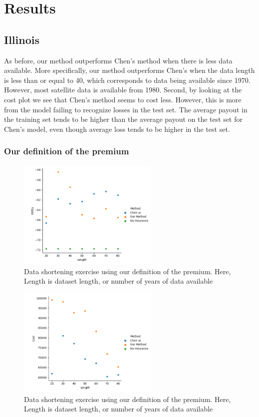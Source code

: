\documentclass[11pt]{article}
\begin{document}
\section{Results}
  \subsection{Illinois}
    As before, our method outperforms Chen's method when there is less data available. More specifically, our method outperforms Chen's when the data length is less than or equal to 40, which corresponds to data being available since 1970. However, most satellite data is available from 1980. Second, by looking at the cost plot we see that Chen's method seems to cost less. However, this is more from the model failing to recognize losses in the test set. The average payout in the training set tends to be higher than the average payout on the test set for Chen's model, even though average loss tends to be higher in the test set.  
    \subsubsection{Our definition of the premium}
    \begin{figure}[h]
        \centering
        \includegraphics[width=0.6\textwidth]{../../../output/figures/Evaluation/Illinois_Utility_Length_ml1.png}
        \caption{Data shortening exercise using our definition of the premium. Here, Length is dataset length, or number of years of data available}
      \end{figure}
      \FloatBarrier

      \begin{figure}[h]
        \centering
        \includegraphics[width=0.6\textwidth]{../../../output/figures/Evaluation/Illinois_Cost_Length_ml1.png}
        \caption{Data shortening exercise using our definition of the premium. Here, Length is dataset length, or number of years of data available}
      \end{figure}
      \FloatBarrier
\end{document}
